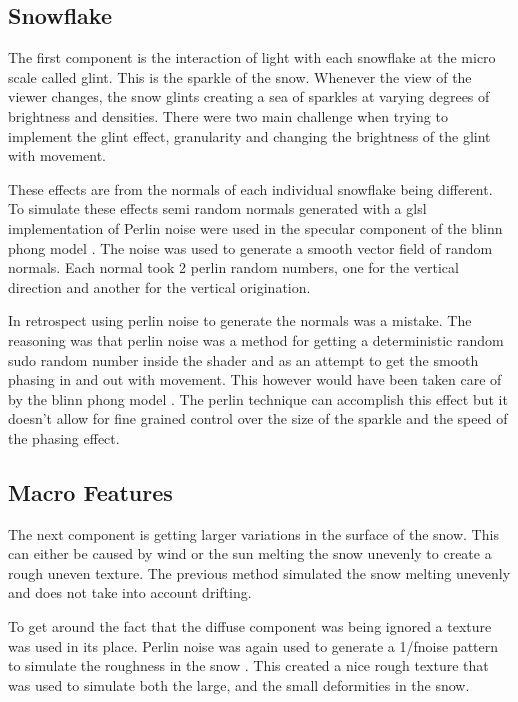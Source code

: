 \documentclass{IEEEtran}
\begin{document}
\subsection{Snowflake}
The first component is the interaction of light with each snowflake at the micro
scale called glint. This is the sparkle of the snow. Whenever the view of the
viewer changes, the snow glints creating a sea of sparkles at varying degrees of
brightness and densities.  There were two main challenge when trying to
implement the glint effect, granularity and changing the brightness of the glint
with movement.

These effects are from the normals of each individual snowflake being different.
To simulate these effects semi random normals generated with a glsl
implementation \cite{noiseglsl} of Perlin noise
\cite{wiki:perlin} were used in the specular component of the blinn phong model
\cite{blinn1977models}. The noise was used to generate a smooth vector field of
random normals. Each normal took 2 perlin random numbers, one for
the vertical direction and another for the vertical origination.

In retrospect using perlin noise to generate the normals was a mistake. The
reasoning was that perlin noise was a method for getting a deterministic random
sudo random number inside the shader and as an attempt to get the smooth phasing
in and out with movement. This however would have been taken care of by the
blinn phong model \cite{blinn1977models}. The perlin technique can accomplish
this effect but it doesn't allow for fine grained control over the size of the
sparkle and the speed of the phasing effect.

\subsection{Macro Features}

The next component is getting larger variations in the surface of the snow.
This can either be caused by wind or the sun melting the snow unevenly to create
a rough uneven texture. The previous method simulated the snow melting unevenly and
does not take into account drifting.

To get around the fact that the diffuse component was being ignored a texture
was used in its place. Perlin noise was again used to generate a 1/fnoise
pattern to simulate the roughness in the snow .  This created a
nice rough texture that was used to simulate both the large, and the small
deformities in the snow.
\end{document}
